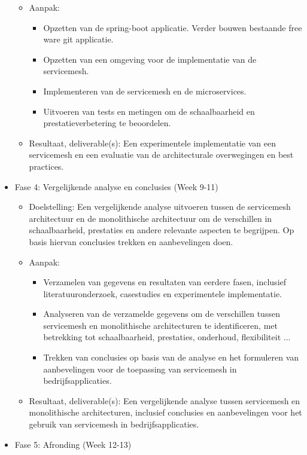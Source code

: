 \begin{itemize}
\begin{itemize}
		\item Aanpak:
		\begin{itemize}
			\item Opzetten van de spring-boot applicatie. Verder bouwen bestaande free ware git applicatie.
			\item Opzetten van een omgeving voor de implementatie van de servicemesh.
			\item Implementeren van de servicemesh en de microservices.
			\item Uitvoeren van tests en metingen om de schaalbaarheid en prestatieverbetering te beoordelen.
		\end{itemize}   
		\item Resultaat, deliverable(s): Een experimentele implementatie van een servicemesh en een evaluatie van de architecturale overwegingen en best practices.
	\end{itemize}  
	\item Fase 4: Vergelijkende analyse en conclusies (Week 9-11)
	\begin{itemize} 
		\item Doelstelling: Een vergelijkende analyse uitvoeren tussen de servicemesh architectuur en de monolithische architectuur om de verschillen in schaalbaarheid, prestaties en andere relevante aspecten te begrijpen. Op basis hiervan conclusies trekken en aanbevelingen doen.
		\item Aanpak:
		\begin{itemize} 
			\item Verzamelen van gegevens en resultaten van eerdere fasen, inclusief literatuuronderzoek, casestudies en experimentele implementatie.
			\item Analyseren van de verzamelde gegevens om de verschillen tussen servicemesh en monolithische architecturen te identificeren, met betrekking tot schaalbaarheid, prestaties, onderhoud, flexibiliteit ...
			\item Trekken van conclusies op basis van de analyse en het formuleren van aanbevelingen voor de toepassing van servicemesh in bedrijfsapplicaties.
		\end{itemize}     
		\item Resultaat, deliverable(s):  Een vergelijkende analyse tussen servicemesh en monolithische architecturen, inclusief conclusies en aanbevelingen voor het gebruik van servicemesh in bedrijfsapplicaties.
	\end{itemize}   
	\item Fase 5: Afronding (Week 12-13)
	\begin{itemize} 

\end{itemize}
\end{itemize}
